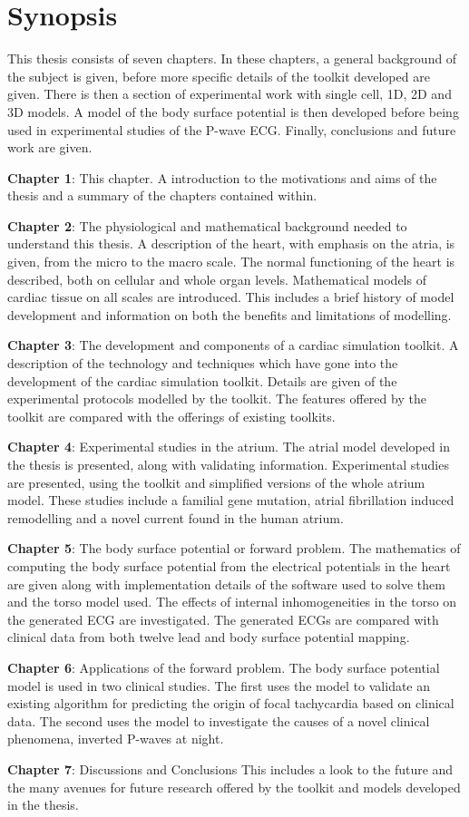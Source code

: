 \section{Synopsis}

This thesis consists of seven chapters.
In these chapters, a general background of the subject is given, before more
specific details of the toolkit developed are given.
There is then a section of experimental work with single cell, 1D, 2D and 3D
models.
A model of the body surface potential is then developed before being used in
experimental studies of the P-wave ECG.
Finally, conclusions and future work are given.

\textbf{Chapter 1}: This chapter.
A introduction to the motivations and aims of the thesis and a summary of the
chapters contained within.

\textbf{Chapter 2}: The physiological and mathematical background needed to
understand this thesis.
A description of the heart, with emphasis on the atria, is given, from the micro to the macro scale.
The normal functioning of the heart is described, both on cellular and whole
organ levels.
Mathematical models of cardiac tissue on all scales are introduced.
This includes a brief history of model development and information on both the
benefits and limitations of modelling.

\textbf{Chapter 3}: The development and components of a cardiac simulation
toolkit.
A description of the technology and techniques which have gone into the
development of the cardiac simulation toolkit.
Details are given of the experimental protocols modelled by the toolkit.
The features offered by the toolkit are compared with the offerings of existing
toolkits.

\textbf{Chapter 4}: Experimental studies in the atrium.
The atrial model developed in the thesis is presented, along with validating
information.
Experimental studies are presented, using the toolkit and simplified
versions of the whole atrium model.
These studies include a familial gene mutation, atrial fibrillation induced
remodelling and a novel current found in the human atrium.

\textbf{Chapter 5}: The body surface potential or forward problem.
The mathematics of computing the body surface potential from the electrical
potentials in the heart are given along with implementation details of the
software used to solve them and the torso model used.
The effects of internal inhomogeneities in the torso on the generated ECG are
investigated.
The generated ECGs are compared with clinical data from both twelve lead and
body surface potential mapping.

\textbf{Chapter 6}: Applications of the forward problem.
The body surface potential model is used in two clinical studies.
The first uses the model to validate an existing algorithm for predicting the
origin of focal tachycardia based on clinical data.
The second uses the model to investigate the causes of a novel clinical
phenomena, inverted P-waves at night.

\textbf{Chapter 7}: Discussions and Conclusions
This includes a look to the future and the many avenues for future research
offered by the toolkit and models developed in the thesis.

